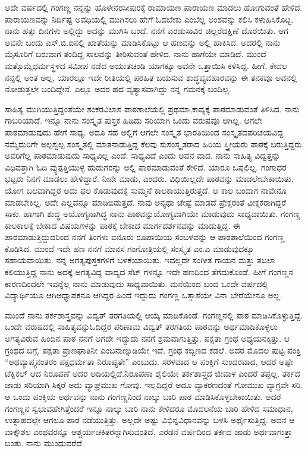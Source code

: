 {ಅದೇ ವರ್ಷದಲ್ಲಿ ಗಂಗಣ್ಣ ನನ್ನನ್ನು ಹೊಳೇನರಸೀಪುರಕ್ಕೆ ರಾಮಾಯಣ ಪಾರಾಯಣ ಮಾಡಲು ಹೋಗುವಂತೆ ಹೇಳಿದ. ಪಾರಾಯಣವನ್ನು ನಿರ್ದಿಷ್ಟ ಅವಧಿಯಲ್ಲಿ ಮುಗಿಸಲು ಹೇಗೆ ಓದಬೇಕು ಎಂಬೆಲ್ಲ ಅಂಶವನ್ನು ಕಲಿಸಿ ಕಳುಹಿಸಿಕೊಟ್ಟ. ನಾನು ಹತ್ತು ದಿನಗಳು ಅಲ್ಲಿದ್ದು ಅದನ್ನು ಮುಗಿಸಿ ಬಂದೆ. ನನಗೆ ಎರಡುಸಾವಿರ ಚಿಲ್ಲರೆ\break ದಕ್ಷಿಣೆ ದೊರೆಯಿತು. ಆಗ ಅವನೇ ಬಂದು ಎಸ್.ಬಿ.ಐನಲ್ಲಿ ಖಾತೆಯನ್ನು ಮಾಡಿಸಿ\-ಕೊಟ್ಟು ಆ ಹಣವನ್ನು ಅಲ್ಲಿ ಹಾಕಿಸಿದ. ಅದರಲ್ಲಿ ನಾನು ಮೈಸೂರಿಗೆ ಬರುವಾಗ ತಂದಿದ್ದ ಸಾಲವನ್ನು ತೀರಿಸುವಂತೆ ಹೇಳಿದ. ನಾನು ಹಾಗೆಯೇ ಮಾಡಿದೆ. ಮುಂದೆ ಮತ್ತೊಮ್ಮೆ\break ಧರ್ಮಸ್ಥಳದ ಸಮೀಪ ನಡೆದ ಅಯುತಚಂಡಿ ಯಾಗಕ್ಕೂ ಅವನೇ ಒತ್ತಾಯಿಸಿ ಕಳಿಸಿದ್ದ. ಹೀಗೆ, ಕೇವಲ ನನ್ನಲ್ಲಿ ಅಂತ ಅಲ್ಲ, ಯಾರಲ್ಲೂ ಇದೇ ರೀತಿಯಲ್ಲಿ ಪರಹಿತ ಬಯಸುವ ಶುದ್ಧವ್ಯವಹಾರವನ್ನು ಈ ತನಕವೂ ಅವನಲ್ಲಿ ನೋಡುತ್ತಲೇ ಬಂದಿದ್ದೇನೆ. ಎಲ್ಲೂ ಅದರ ಹದ ವ್ಯತ್ಯಾಸವಾಗಿದ್ದು ನನ್ನ ಗಮನಕ್ಕೆ ಬಂದಿಲ್ಲ.

ಸಾಹಿತ್ಯ  ಮುಗಿಯುತ್ತಿದ್ದಂತೆಯೇ ಶಂಕರವಿಲಾಸ ಪಾಠಶಾಲೆಯಲ್ಲಿ ಪ್ರಥಮಾ,\break ಕಾವ್ಯಕ್ಕೆ ಪಾಠಮಾಡುವಂತೆ ತಿಳಿಸಿದ. ನಾನು ಗಾಬರಿಯಾದೆ. ಇನ್ನೂ ನಾನು ಸಂಸ್ಕೃತ ಪುಸ್ತಕ ಹಿಡಿದು ಸರಿಯಾಗಿ ಒಂದು ವರುಷವೂ ಆಗಿಲ್ಲ. ಆಗಲೇ ಪಾಠಮಾಡುವುದು ಹೇಗೆ ಸಾಧ್ಯ. ಅದೂ ಸಹ ಅಲ್ಲಿಗೆ ಆಗಲೇ ಸಂಸ್ಕೃತ ಭಾರತಿಯಿಂದ ಸಂಸ್ಕೃತದ\break ಪರಿಚಯವಿದ್ದ ನಮ್ಮೆದುರಿಗೇ ಅಲ್ಪಸ್ವಲ್ಪ ಸಂಸ್ಕೃತಲ್ಲಿ ಮಾತನಾಡುತ್ತಿದ್ದ ಕೆಲವು ಸುಸಂಸ್ಕೃತರಾದ ಹಿರಿಯ ಸ್ತ್ರೀಯರು ಪಾಠಕ್ಕೆ ಬರುತ್ತಿದ್ದರು. ಅವರಿಗೆಲ್ಲ ಪಾಠಮಾಡುವುದು ಸಾಧ್ಯವಿಲ್ಲ ಎಂದೆ. ಸಾಧ್ಯವಿದೆ ಎಂದು ಅವನ ವಾದ. ನಾನು ಸಾಹಿತ್ಯ ವಿದ್ವತ್ತನ್ನು ವಿಧಿವತ್ತಾಗಿ ಓದಿ ವ್ಯುತ್ಪತ್ತಿಯುಳ್ಳ ಹುಡುಗರನ್ನು ಅಲ್ಲಿ ಪಾಠಮಾಡುವಂತೆ ಕೇಳಿದೆ. ಯಾರೂ ಒಪ್ಪಲಿಲ್ಲ. ಗಂಗಾಧರ ಭಟ್ಟರು ನಿನಗೆ ಮಾಡಲು ಹೇಳಿದ್ದಾರೆ. ನೀನೇ ಮಾಡು, ಎಂದರು. ವಿಧಿಯಿಲ್ಲದೇ ಪಾಠವನ್ನು ಮಾಡಲೇಬೇಕಾಯಿತು. ಯೋಗ ಬಲವಾಗಿದ್ದರೆ ಅದು ಫಲ ಕೊಡುವುದಕ್ಕೆ ಸುಮ್ಮನೆ ಕಾಲಕಾಯುತ್ತಿರುತ್ತದೆ. ಆ ಕಾಲ ಬಂದಾಗ ನಾವೇನೂ ಮಾಡಬೇಕಿಲ್ಲ. ಅದೇ ಎಲ್ಲವನ್ನೂ ಮಾಡಿಬಿಡುತ್ತದೆ. ನಾವು ಅನ್ಯಥಾ ಚೇಷ್ಟೆ ಮಾಡದೆ ಪ್ರೇಕ್ಷರಂತೆ ವೀಕ್ಷಕರಾಗಿದ್ದರೆ ಸಾಕು. ಹಾಗಾಗಿ ಶುದ್ಧ ಅಯೋಗ್ಯನಾಗಿದ್ಧ ನಾನು ಪಾಠವನ್ನು\break ಯೋಗ್ಯವಾಗಿಯೇ ಮಾಡುವುದು ಸಾಧ್ಯವಾಯಿತು. ಗಂಗಣ್ಣ ಕಾಲಕಾಲಕ್ಕೆ ಬೇಕಾದ ವಿಷಯಗಳನ್ನು ಪಾಠಕ್ಕೆ ಬೇಕಾದ ಮಾರ್ಗದರ್ಶನವನ್ನು ಮಾಡುತ್ತಿದ್ದ. ಈ ಪಾಠ\break ಮಾಡುತ್ತಿದ್ದುದರಿಂದ ನನಗೆ ತಿಂಗಳು ಐನೂರು ರೂಪಾಯಿಯ ಸಂಬಳವನ್ನು ಆ ಪಾಠಶಾಲೆಯಿಂದ ಗಂಗಣ್ಣ ಕೊಡಿಸಿದ. ಮುಂದೆ ಇದೇ ಹಣ ನನಗೆ ಮಾನಸ ಗಂಗೋತ್ರಿಯಲ್ಲಿ ಸಂಸ್ಕೃತ ಎಂ.ಎ ಮಾಡುವುದಕ್ಕೂ ಸಹಾಯವಾಯಿತು. ನನ್ನ ಅಗತ್ಯ\break ಪುಸ್ತಕಗಳಿಗೆ ಬಳಕೆಯಾಯಿತು. ಇದಲ್ಲದೇ ಸಂಗೀತ \enginline{-} ಗಾಯನ ಮತ್ತು ತಬಲಾ ಕಲಿಯುತ್ತಿದ್ದ ನಾನು ಅದಕ್ಕೆ ಅಗತ್ಯವಿದ್ದ ವಾದ್ಯದ ಸೆಟ್ ಗಳನ್ನೂ ಇದೇ ಹಣದಿಂದ ತೆಗೆದು\-ಕೊಂಡೆ. ಹೀಗೆ ಗಂಗಣ್ಣನ ಕಾರಣದಿಂದಲೇ ಇವನ್ನೆಲ್ಲ ನಾನು ಮಾಡುವುದು ಸಾಧ್ಯ\-ವಾಯಿತು. ಮನೆಯಿಂದ ಬಂದ ಒಂದೇ ವರ್ಷದಲ್ಲಿ ವಿದ್ಯಾರ್ಥಿಯೂ ಆಗಿ\break ಅಧ್ಯಾಪಕನೂ ಆಗಿದ್ದರ ಹಿಂದೆ ಇದ್ದುದು ಗಂಗಣ್ಣ ಒತ್ತಾಸೆಯೇ ವಿನಾ ಬೇರೆಯೇನೂ ಅಲ್ಲ. 

ಮುಂದೆ ನಾನು ತರ್ಕಶಾಸ್ತ್ರವನ್ನು ವಿದ್ವತ್ ತರಗತಿಯಲ್ಲಿ ಆಯ್ಕೆ ಮಾಡಿಕೊಂಡೆ. ಗಂಗಣ್ಣನಲ್ಲಿ  ಪಾಠ ಮಾಡಿಸಿಕೊಳ್ಳುತ್ತಿದ್ದೆ. ಒಂದೇ ವರುಷದಲ್ಲಿ ಸಾಹಿತ್ಯವನ್ನು\break ಓದಿದ್ದರ ಪರಿಣಾಮ ವಿದ್ವತ್ ತರಗತಿಯ ಪಾಠವನ್ನು ಅರ್ಥಮಾಡಿಕೊಳ್ಳಲು ಅಗತ್ಯ\-ವಿರುವ ಹಿಂದಿನ ಪಾಠ ನನಗೆ ಆಗದೇ ಇದ್ದುದು ನನಗೆ ಶ್ರಮವಾಗುತ್ತಿತ್ತು. \hbox{ಪಕ್ಷತಾ} ಗ್ರಂಥ ಅಧ್ಯಯನಕ್ಕಿತ್ತು. ಆ ಗ್ರಂಥದ ಬಗ್ಗೆ, ಪಕ್ಷತಾ ಪ್ರಾಣಘಾತಿನೀ ಎಂಬ\break ನಾಣ್ನುಡಿಯೇ ಇದೆ. ಗ್ರಂಥ ಕಬ್ಬಿಣದ ಕಡಲೆ. ಅದರ ಮೊದಲ ಪುಟ್ಟ ಪಂಕ್ತಿ “ಅಥ\break ವ್ಯಾಪ್ತ್ಯನಂತರಂ ಪಕ್ಷ\-ಧರ್ಮತಾ ನಿರೂಪ್ಯತೇ” ಎಂಬುದು. ಸರಳವಾದ ಆ \hbox{ಪಂಕ್ತಿಗೆ} ಸುಂದರವಾದ, ಆದರೆ ಅಷ್ಟೇ ಟೆಕ್ನಿಕಲ್ ಆದ ನಿರೂಪಣೆ ಅದರ ಅಡಿಯಲ್ಲಿದೆ.\break ನಿರೂಪಣಾ ಶೈಲಿಯೇ ತರ್ಕ\-ಶಾಸ್ತ್ರದ ಜೀವಾಳ ಎಂದರೆ ತಪ್ಪಲ್ಲ. ತರ್ಕದ ಜಾಡು ಸರಿಯಾಗಿ ಸಿಕ್ಕರೆ ಅದು ವ್ಯಾಘ್ರಮುಖ ಗೋವು. ಇಲ್ಲದಿದ್ದರೆ ಅದೂ ವ್ಯಾಕರಣದಂತೆ ಗೋಮುಖ ವ್ಯಾಗ್ರವೇ ಸರಿ. ಆ ಒಂದು ಪಂಕ್ತಿಯ ಅರ್ಥವನ್ನು ನಾನು ಗಂಗಣ್ಣನಿಂದ ನಾಲ್ಕು ಬಾರಿ ಪಾಠ ಮಾಡಿಸಿಕೊಳ್ಳಬೇಕಾಯಿತು. ಆದರೆ ಗಂಗಣ್ಣನ ಸ್ವಭಾವ\break ಹೇಗಿತ್ತೆಂದರೆ ಇನ್ನೂ ನಾಲ್ಕು ಬಾರಿ ನಾನು ಕೇಳಿದರೂ ಮೊದಲನೆಯ ಬಾರಿ ಹೇಳಿದ ಸಮಾಧಾನ, ಉತ್ಸಾಹದಲ್ಲೇ ಆಗಲೂ ಪಾಠ ನಡೆಯುತ್ತಿತ್ತು. ಅಲ್ಲದೇ ಅಷ್ಟು ವಿಭಿನ್ನ\break ವಿಧಾನವನ್ನು ಬಳಸಿ ಅರ್ಥೈಸುತ್ತಿದ್ದ. ಅವನ ಆ ವಾಕ್ಕೌಶಲ ಎಂಥವರನ್ನೂ ಆಶ್ಚರ್ಯ\break ಚಕಿತರನ್ನಾಗಿಸುವಂತಿದೆ,  ಎರಡನೆ ವರ್ಷದಿಂದ ತರ್ಕದ ಜಾಡು ಅರ್ಥವಾಗುತ್ತಾ ಬಂತು. ನಾನು ಮುಂದುವರೆದೆ. 

}
